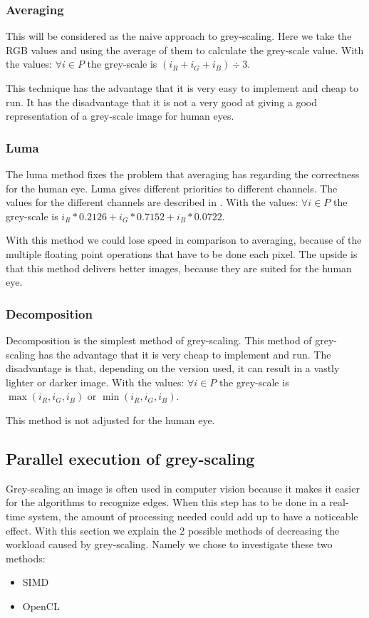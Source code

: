 \documentclass[a4paper]{article}
\begin{document}
\subsubsection{Averaging}
This will be considered as the naive approach to grey-scaling. Here we take the RGB values and using the average of them to calculate the grey-scale value. 
With the values: \( \forall i \in P \) the grey-scale is \( \left( i_{R} + i_{G} + i_{B} \right) \div 3 \).

This technique has the advantage that it is very easy to implement and cheap to run. It has the disadvantage that it is not a very good at giving a good representation of a grey-scale image for human eyes.

\subsubsection{Luma}
The luma method fixes the problem that averaging has regarding the correctness for the human eye. Luma gives different priorities to different channels. The values for the different channels are described in \cite{HDTV-REC}.
With the values: \( \forall i \in P \) the grey-scale is \(  i_{R}*0.2126 + i_{G}*0.7152 + i_{B}*0.0722  \).

With this method we could lose speed in comparison to averaging, because of the multiple floating point operations that have to be done each pixel. The upside is that this method delivers better images, because they are suited for the human eye.

\subsubsection{Decomposition}
Decomposition is the simplest method of grey-scaling. This method of grey-scaling has the advantage that it is very cheap to implement and run. The disadvantage is that, depending on the version used, it can result in a vastly lighter or darker image. 
With the values: \( \forall i \in P \) the grey-scale is \(  \max(i_{R}, i_{G}, i_{B}) \) or \(  \min(i_{R}, i_{G}, i_{B}) \).

This method is not adjusted for the human eye. 

\subsection{Parallel execution of grey-scaling}
Grey-scaling an image is often used in computer vision because it makes it easier for the algorithms to recognize edges. When this step has to be done in a real-time system, the amount of processing needed could add up to have a noticeable effect. With this section we explain the 2 possible methods of decreasing the workload caused by grey-scaling. Namely we chose to investigate these two methods:
\begin{itemize}
\item SIMD
\item OpenCL
\end{itemize}
\end{document}
